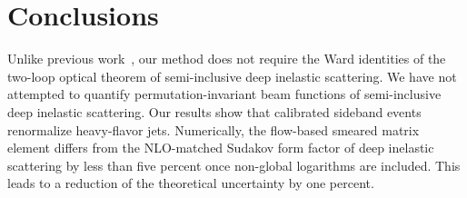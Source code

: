 \section{Conclusions}\label{sec:conclusions}

Unlike previous
work~\cite{TPC:0664-Non-Global-Logarithms-Beyond-Next-to-Leading-Power-September-22-2026},
our method does not require the Ward identities of the two-loop optical
theorem of semi-inclusive deep inelastic scattering. We have not
attempted to quantify permutation-invariant beam functions of
semi-inclusive deep inelastic scattering. Our results show that
calibrated sideband events renormalize heavy-flavor jets. Numerically,
the flow-based smeared matrix element differs from the NLO-matched
Sudakov form factor of deep inelastic scattering by less than five
percent once non-global logarithms are included. This leads to a
reduction of the theoretical uncertainty by one percent.

